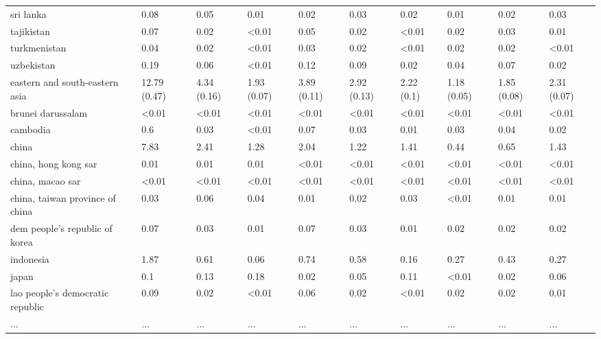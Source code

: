 \begin{table}[!h]
\begin{tabular}[t]{llllllllll}
sri lanka & 0.08 & 0.05 & 0.01 & 0.02 & 0.03 & 0.02 & 0.01 & 0.02 & 0.03\\
\addlinespace
tajikistan & 0.07 & 0.02 & <0.01 & 0.05 & 0.02 & <0.01 & 0.02 & 0.03 & 0.01\\
turkmenistan & 0.04 & 0.02 & <0.01 & 0.03 & 0.02 & <0.01 & 0.02 & 0.02 & <0.01\\
uzbekistan & 0.19 & 0.06 & <0.01 & 0.12 & 0.09 & 0.02 & 0.04 & 0.07 & 0.02\\
eastern and south-eastern asia & 12.79 (0.47) & 4.34 (0.16) & 1.93 (0.07) & 3.89 (0.11) & 2.92 (0.13) & 2.22 (0.1) & 1.18 (0.05) & 1.85 (0.08) & 2.31 (0.07)\\
brunei darussalam & <0.01 & <0.01 & <0.01 & <0.01 & <0.01 & <0.01 & <0.01 & <0.01 & <0.01\\
\addlinespace
cambodia & 0.6 & 0.03 & <0.01 & 0.07 & 0.03 & 0.01 & 0.03 & 0.04 & 0.02\\
china & 7.83 & 2.41 & 1.28 & 2.04 & 1.22 & 1.41 & 0.44 & 0.65 & 1.43\\
china, hong kong sar & 0.01 & 0.01 & 0.01 & <0.01 & <0.01 & <0.01 & <0.01 & <0.01 & <0.01\\
china, macao sar & <0.01 & <0.01 & <0.01 & <0.01 & <0.01 & <0.01 & <0.01 & <0.01 & <0.01\\
china, taiwan province of china & 0.03 & 0.06 & 0.04 & 0.01 & 0.02 & 0.03 & <0.01 & 0.01 & 0.01\\
\addlinespace
dem people's republic of korea & 0.07 & 0.03 & 0.01 & 0.07 & 0.03 & 0.01 & 0.02 & 0.02 & 0.02\\
indonesia & 1.87 & 0.61 & 0.06 & 0.74 & 0.58 & 0.16 & 0.27 & 0.43 & 0.27\\
japan & 0.1 & 0.13 & 0.18 & 0.02 & 0.05 & 0.11 & <0.01 & 0.02 & 0.06\\
lao people's democratic republic & 0.09 & 0.02 & <0.01 & 0.06 & 0.02 & <0.01 & 0.02 & 0.02 & 0.01\\
... & ... & ... & ... & ... & ... & ... & ... & ... & ...\\
\bottomrule
\end{tabular}
\end{table}
